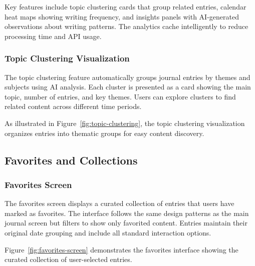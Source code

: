 
Key features include topic clustering cards that group related entries, calendar heat maps showing writing frequency, and insights panels with AI-generated observations about writing patterns. The analytics cache intelligently to reduce processing time and API usage.

\subsubsection{Topic Clustering Visualization}

The topic clustering feature automatically groups journal entries by themes and subjects using AI analysis. Each cluster is presented as a card showing the main topic, number of entries, and key themes. Users can explore clusters to find related content across different time periods.

As illustrated in Figure~\ref{fig:topic-clustering}, the topic clustering visualization organizes entries into thematic groups for easy content discovery.


\subsection{Favorites and Collections}

\subsubsection{Favorites Screen}

The favorites screen displays a curated collection of entries that users have marked as favorites. The interface follows the same design patterns as the main journal screen but filters to show only favorited content. Entries maintain their original date grouping and include all standard interaction options.

Figure~\ref{fig:favorites-screen} demonstrates the favorites interface showing the curated collection of user-selected entries.


